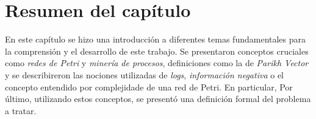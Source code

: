 \section{Resumen del capítulo}
\label{sec:2.resumen}
En este capítulo se hizo una introducción a diferentes temas fundamentales para la comprensión y el desarrollo de este trabajo. 
Se presentaron conceptos cruciales como \textit{redes de Petri} y \textit{minería de procesos}, definiciones como la
de \textit{Parikh Vector} y se describireron las nociones utilizadas de \textit{logs}, \textit{información negativa} o el concepto 
entendido por complejidade de una red de Petri.
En particular, 
Por último, utilizando estos conceptos, se presentó una definición formal del problema a tratar.
